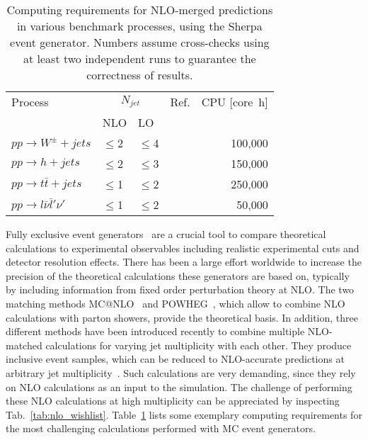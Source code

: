 \begin{table}
  \centering
  \begin{tabular}{llllr}
    \hline
    Process & \multicolumn{2}{c}{$N_{jet}$} & Ref. & CPU [core~h] \\
    & NLO & LO & & \\
    \hline\hline
    $pp\to W^\pm+jets$ & $\le$2 & $\le$4 & \cite{Hoeche:2012yf} & 100,000 \\
    $pp\to h+jets$ & $\le$2 & $\le$3 & \cite{Hoeche:2013xxx} & 150,000 \\
    $pp\to t\bar{t}+jets$ & $\le$1 & $\le$2 & \cite{Hoeche:2013mua} & 250,000 \\
    $pp\to l\bar{\nu}\bar{l}'\nu'$ & $\le$1 & $\le$2 & \cite{Cascioli:2013xxx} & 50,000 \\
    \hline
  \end{tabular}
  \caption{Computing requirements for NLO-merged predictions in
    various benchmark processes, using the Sherpa event generator.
    Numbers assume cross-checks using at least two independent runs
    to guarantee the correctness of results.
    \label{tab:nlo_merging}}
\end{table}

Fully exclusive event generators~\cite{Buckley:2011ms} are a crucial tool 
to compare theoretical calculations to experimental observables including
realistic experimental cuts and detector resolution effects. 
There has been a large effort worldwide to increase the precision 
of the theoretical calculations these generators are based on, 
typically by including information from fixed order perturbation theory 
at NLO. The two matching methods MC@NLO~\cite{Frixione:2002ik} and 
POWHEG~\cite{Nason:2004rx}, which allow to combine NLO calculations with
parton showers, provide the theoretical basis. In addition, three different 
methods have been introduced recently to combine multiple NLO-matched 
calculations for varying jet multiplicity with each other.
They produce inclusive event samples, which can be reduced to NLO-accurate 
predictions at arbitrary jet multiplicity~\cite{Hoeche:2012yf,Lonnblad:2012ix,Frederix:2012ps}.
Such calculations are very demanding, since they rely on NLO calculations 
as an input to the simulation. The challenge of performing these NLO
calculations at high multiplicity can be appreciated by inspecting
Tab.~\ref{tab:nlo_wishlist}. Table~\ref{tab:nlo_merging} lists some 
exemplary computing requirements for the most challenging calculations
performed with MC event generators.

